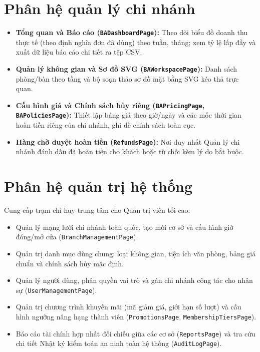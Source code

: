 \section{Phân hệ quản lý chi nhánh}
\label{sec:gd_quanlychinhanh}

\begin{itemize}
    \item \textbf{Tổng quan và Báo cáo (\texttt{BADashboardPage}):} Theo dõi biểu đồ doanh thu thực tế (theo định nghĩa đơn đã dùng) theo tuần, tháng; xem tỷ lệ lấp đầy và xuất dữ liệu báo cáo chi tiết ra tệp CSV.
    \item \textbf{Quản lý không gian và Sơ đồ SVG (\texttt{BAWorkspacePage}):} Danh sách phòng/bàn theo tầng và bộ soạn thảo sơ đồ mặt bằng SVG kéo thả trực quan.
    \item \textbf{Cấu hình giá và Chính sách hủy riêng (\texttt{BAPricingPage}, \texttt{BAPoliciesPage}):} Thiết lập bảng giá theo giờ/ngày và các mốc thời gian hoàn tiền riêng của chi nhánh, ghi đè chính sách toàn cục.
    \item \textbf{Hàng chờ duyệt hoàn tiền (\texttt{RefundsPage}):} Nơi duy nhất Quản lý chi nhánh đánh dấu đã hoàn tiền cho khách hoặc từ chối kèm lý do bắt buộc.
\end{itemize}


\section{Phân hệ quản trị hệ thống}
\label{sec:gd_quantri}

Cung cấp trạm chỉ huy trung tâm cho Quản trị viên tối cao:
\begin{itemize}
    \item Quản lý mạng lưới chi nhánh toàn quốc, tạo mới cơ sở và cấu hình giờ đóng/mở cửa (\texttt{BranchManagementPage}).
    \item Quản trị danh mục dùng chung: loại không gian, tiện ích văn phòng, bảng giá chuẩn và chính sách hủy mặc định.
    \item Quản lý người dùng, phân quyền vai trò và gán chi nhánh công tác cho nhân sự (\texttt{UserManagementPage}).
    \item Quản trị chương trình khuyến mãi (mã giảm giá, giới hạn số lượt) và cấu hình ngưỡng nâng hạng thành viên (\texttt{PromotionsPage}, \texttt{MembershipTiersPage}).
    \item Báo cáo tài chính hợp nhất đối chiếu giữa các cơ sở (\texttt{ReportsPage}) và tra cứu chi tiết Nhật ký kiểm toán an ninh toàn hệ thống (\texttt{AuditLogPage}).
\end{itemize}

